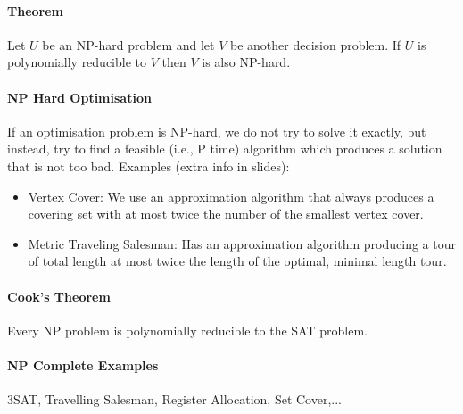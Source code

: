 \paragraph{Theorem} 
Let \(U\) be an NP-hard problem and let \(V\) be another decision problem. If \(U\) is polynomially reducible to \(V\) then \(V\) is also NP-hard.

\paragraph{NP Hard Optimisation}
If an optimisation problem is NP-hard, we do not try to solve it exactly, but instead, try to find a feasible (i.e., P time) algorithm which produces a solution that is not too bad. Examples (extra info in slides):
\begin{itemize}
    \item Vertex Cover: We use an approximation algorithm that always produces a covering set with at most twice the number of the smallest vertex cover.
    \item Metric Traveling Salesman: Has an approximation algorithm producing a tour of total length at most twice the length of the optimal, minimal length tour.  
\end{itemize}

\paragraph{Cook's Theorem}
Every NP problem is polynomially reducible to the SAT problem.

\paragraph{NP Complete Examples} 
3SAT, Travelling Salesman, Register Allocation, Set Cover,...